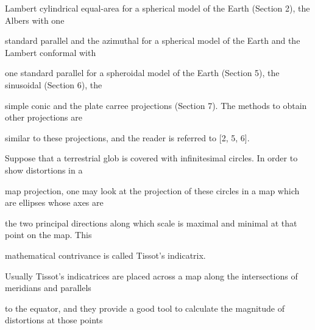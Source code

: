 \documentclass[a4paper,portrait,12pt]{article}
\begin{document}
\begin{flushleft}
Lambert cylindrical equal-area for a spherical model of the Earth (Section 2), the Albers with one
\end{flushleft}


\begin{flushleft}
standard parallel and the azimuthal for a spherical model of the Earth and the Lambert conformal with
\end{flushleft}


\begin{flushleft}
one standard parallel for a spheroidal model of the Earth (Section 5), the sinusoidal (Section 6), the
\end{flushleft}


\begin{flushleft}
simple conic and the plate carree projections (Section 7). The methods to obtain other projections are
\end{flushleft}


\begin{flushleft}
similar to these projections, and the reader is referred to [2, 5, 6].
\end{flushleft}


\begin{flushleft}
Suppose that a terrestrial glob is covered with infinitesimal circles. In order to show distortions in a
\end{flushleft}


\begin{flushleft}
map projection, one may look at the projection of these circles in a map which are ellipses whose axes are
\end{flushleft}


\begin{flushleft}
the two principal directions along which scale is maximal and minimal at that point on the map. This
\end{flushleft}


\begin{flushleft}
mathematical contrivance is called Tissot's indicatrix.
\end{flushleft}


\begin{flushleft}
Usually Tissot's indicatrices are placed across a map along the intersections of meridians and parallels
\end{flushleft}


\begin{flushleft}
to the equator, and they provide a good tool to calculate the magnitude of distortions at those points
\end{flushleft}
\end{document}
